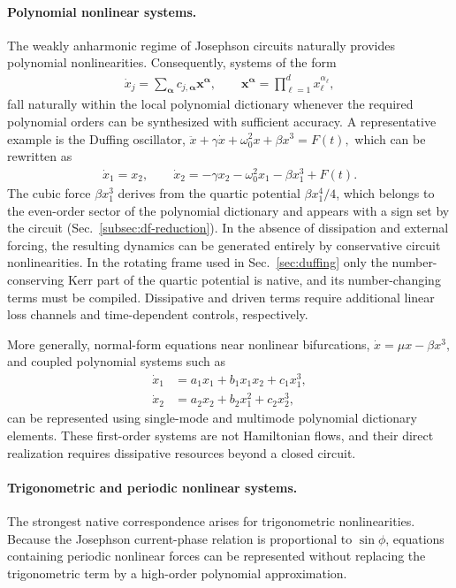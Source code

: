 \documentclass[pra,twocolumn,superscriptaddress,nofootinbib,floatfix]{revtex4-2}
\theoremstyle{remark}
\begin{document}
\paragraph{Polynomial nonlinear systems.}
The weakly anharmonic regime of Josephson circuits naturally provides polynomial nonlinearities. Consequently, systems of the form
\begin{align}
\dot x_j=\sum_{\boldsymbol{\alpha}}c_{j,\boldsymbol{\alpha}}\mathbf x^{\boldsymbol{\alpha}},\qquad\mathbf x^{\boldsymbol{\alpha}}=\prod_{\ell=1}^{d}x_{\ell}^{\alpha_{\ell}},
\label{eq:polynomial-vector-field}
\end{align}
fall naturally within the local polynomial dictionary whenever the required polynomial orders can be synthesized with sufficient accuracy.
A representative example is the Duffing oscillator,
\(\ddot x+\gamma\dot x+\omega_0^2x+\beta x^3=F(t),\)
which can be rewritten as
\begin{align}
\dot x_1 = x_2,\qquad\dot x_2 =-\gamma x_2-\omega_0^2x_1-\beta x_1^3+F(t).
\end{align}
The cubic force \(\beta x_1^3\) derives from the quartic potential \(\beta x_1^4/4\), which belongs to the even-order sector of the polynomial dictionary and appears with a sign set by the circuit (Sec.~\ref{subsec:df-reduction}). In the absence of dissipation and external forcing, the resulting dynamics can be generated entirely by conservative circuit nonlinearities. In the rotating frame used in Sec.~\ref{sec:duffing} only the number-conserving Kerr part of the quartic potential is native, and its number-changing terms must be compiled. Dissipative and driven terms require additional linear loss channels and time-dependent controls, respectively.

More generally, normal-form equations near nonlinear bifurcations, \(\dot x=\mu x-\beta x^3,\) and coupled polynomial systems such as
\begin{align}
\dot x_1&=a_1x_1+b_1x_1x_2+c_1x_1^3,\nonumber\\
\dot x_2&=a_2x_2+b_2x_1^2+c_2x_2^3,
\end{align}
can be represented using single-mode and multimode polynomial dictionary elements. These first-order systems are not Hamiltonian flows, and their direct realization requires dissipative resources beyond a closed circuit.

\paragraph{Trigonometric and periodic nonlinear systems.}
The strongest native correspondence arises for trigonometric nonlinearities. Because the Josephson current-phase relation is proportional to \(\sin\phi\), equations containing periodic nonlinear forces can be represented without replacing the trigonometric term by a high-order polynomial approximation.
\end{document}

